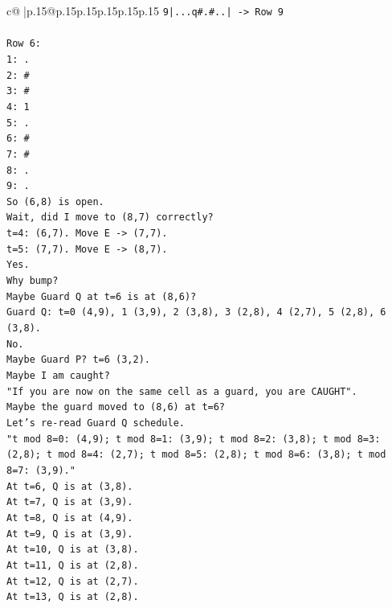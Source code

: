 \documentclass{article}
\begin{document}
{\begin{supertabular}{c@{$\;$}|p{.15\linewidth}@{}p{.15\linewidth}p{.15\linewidth}p{.15\linewidth}p{.15\linewidth}p{.15\linewidth}}
{{{\texttt{9|...q\#.\#..| {-}> Row 9} \\
\\ 
\texttt{Row 6:} \\
\texttt{1: .} \\
\texttt{2: \#} \\
\texttt{3: \#} \\
\texttt{4: 1} \\
\texttt{5: .} \\
\texttt{6: \#} \\
\texttt{7: \#} \\
\texttt{8: .} \\
\texttt{9: .} \\
\texttt{So (6,8) is open.} \\
\texttt{Wait, did I move to (8,7) correctly?} \\
\texttt{t=4: (6,7). Move E {-}> (7,7).} \\
\texttt{t=5: (7,7). Move E {-}> (8,7).} \\
\texttt{Yes.} \\
\texttt{Why bump?} \\
\texttt{Maybe Guard Q at t=6 is at (8,6)?} \\
\texttt{Guard Q: t=0 (4,9), 1 (3,9), 2 (3,8), 3 (2,8), 4 (2,7), 5 (2,8), 6 (3,8).} \\
\texttt{No.} \\
\texttt{Maybe Guard P? t=6 (3,2).} \\
\texttt{Maybe I am caught?} \\
\texttt{"If you are now on the same cell as a guard, you are CAUGHT".} \\
\texttt{Maybe the guard moved to (8,6) at t=6?} \\
\texttt{Let's re{-}read Guard Q schedule.} \\
\texttt{"t mod 8=0: (4,9); t mod 8=1: (3,9); t mod 8=2: (3,8); t mod 8=3: (2,8); t mod 8=4: (2,7); t mod 8=5: (2,8); t mod 8=6: (3,8); t mod 8=7: (3,9)."} \\
\texttt{At t=6, Q is at (3,8).} \\
\texttt{At t=7, Q is at (3,9).} \\
\texttt{At t=8, Q is at (4,9).} \\
\texttt{At t=9, Q is at (3,9).} \\
\texttt{At t=10, Q is at (3,8).} \\
\texttt{At t=11, Q is at (2,8).} \\
\texttt{At t=12, Q is at (2,7).} \\
\texttt{At t=13, Q is at (2,8).} \\
}}}
\end{supertabular}}
\end{document}
